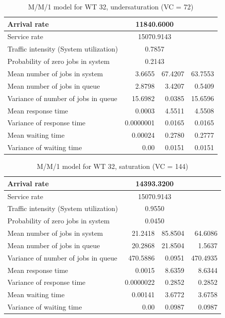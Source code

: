 \documentclass[11pt,a4paper]{article}
\begin{document}
\begin{table}[H]
	\centering
	\caption{M/M/1 model for WT 32, undersaturation (VC = 72)}
		\begin{tabular}{|l|r|r|r|}
			\hline
			Arrival rate & \multicolumn{ 2}{c|}{11840.6000} & \multicolumn{1}{l|}{} \\ \hline
			Service rate & \multicolumn{ 2}{c|}{15070.9143} & \multicolumn{1}{l|}{} \\ \hline
			Traffic intensity (System utilization) & \multicolumn{ 2}{c|}{0.7857} & \multicolumn{1}{l|}{} \\ \hline
			Probability of zero jobs in system & \multicolumn{ 2}{c|}{0.2143} & \multicolumn{1}{l|}{} \\ \hline
			Mean number of jobs in system & 3.6655 & 67.4207 & 63.7553 \\ \hline
			Mean number of jobs in queue & 2.8798 & 3.4207 & 0.5409 \\ \hline
			Variance of number of jobs in queue & 15.6982 & 0.0385 & 15.6596 \\ \hline
			Mean response time & 0.0003 & 4.5511 & 4.5508 \\ \hline
			Variance of response time & 0.0000001 & 0.0165 & 0.0165 \\ \hline
			Mean waiting time & 0.00024 & 0.2780 & 0.2777 \\ \hline
			Variance of waiting time & 0.00 & 0.0151 & 0.0151 \\ \hline
		\end{tabular}
		\label{}
	\end{table}
	

\begin{table}[H]
	\centering
	\caption{M/M/1 model for WT 32, saturation (VC = 144)}
	\begin{tabular}{|l|r|r|r|}
		\hline
		Arrival rate & \multicolumn{ 2}{c|}{14393.3200} & \multicolumn{1}{l|}{} \\ \hline
		Service rate & \multicolumn{ 2}{c|}{15070.9143} & \multicolumn{1}{l|}{} \\ \hline
		Traffic intensity (System utilization) & \multicolumn{ 2}{c|}{0.9550} & \multicolumn{1}{l|}{} \\ \hline
		Probability of zero jobs in system & \multicolumn{ 2}{c|}{0.0450} & \multicolumn{1}{l|}{} \\ \hline
		Mean number of jobs in system & 21.2418 & 85.8504 & 64.6086 \\ \hline
		Mean number of jobs in queue & 20.2868 & 21.8504 & 1.5637 \\ \hline
		Variance of number of jobs in queue & 470.5886 & 0.0951 & 470.4935 \\ \hline
		Mean response time & 0.0015 & 8.6359 & 8.6344 \\ \hline
		Variance of response time & 0.0000022 & 0.2852 & 0.2852 \\ \hline
		Mean waiting time & 0.00141 & 3.6772 & 3.6758 \\ \hline
		Variance of waiting time & 0.00 & 0.0987 & 0.0987 \\ \hline
	\end{tabular}
	\label{}
\end{table}
\end{document}
